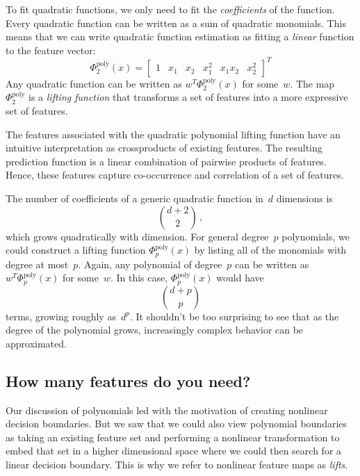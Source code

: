 \documentclass{tufte-book}
\begin{document}
To fit quadratic functions, we only need to fit the \emph{coefficients}
of the function. Every quadratic function can be written as a sum of
quadratic monomials. This means that we can write quadratic function
estimation as fitting a \emph{linear} function to the feature vector: \[
\Phi_2^{\text{poly}}(x) =   \begin{bmatrix} 1& x_1 &x_2 & x_1^2 & x_1 x_2 & x_2^2
    \end{bmatrix}^T
\] Any quadratic function can be written as
\(w^T \Phi_2^{\text{poly}}(x)\) for some~\(w\). The map
\(\Phi_2^{\text{poly}}\) is a \emph{lifting function} that transforms a
set of features into a more expressive set of features.

The features associated with the quadratic polynomial lifting function
have an intuitive interpretation as crossproducts of existing features.
The resulting prediction function is a linear combination of pairwise
products of features. Hence, these features capture co-occurrence and
correlation of a set of features.

The number of coefficients of a generic quadratic function in~\(d\)
dimensions is \[
{{d+2} \choose 2}\,,
\] which grows quadratically with dimension. For general degree~\(p\)
polynomials, we could construct a lifting function
\(\Phi_p^{\text{poly}}(x)\) by listing all of the monomials with degree
at most~\(p\). Again, any polynomial of degree~\(p\) can be written as
\(w^T \Phi_p^{\text{poly}}(x)\) for some~\(w\). In this case,
\(\Phi_p^{\text{poly}}(x)\) would have \[
{{d+p} \choose p}
\] terms, growing roughly as~\(d^p\). It shouldn't be too surprising to
see that as the degree of the polynomial grows, increasingly complex
behavior can be approximated.

\hypertarget{how-many-features-do-you-need}{%
\subsection{How many features do you
need?}\label{how-many-features-do-you-need}}

Our discussion of polynomials led with the motivation of creating
nonlinear decision boundaries. But we saw that we could also view
polynomial boundaries as taking an existing feature set and performing a
nonlinear transformation to embed that set in a higher dimensional space
where we could then search for a linear decision boundary. This is why
we refer to nonlinear feature maps as \emph{lifts}.
\end{document}
